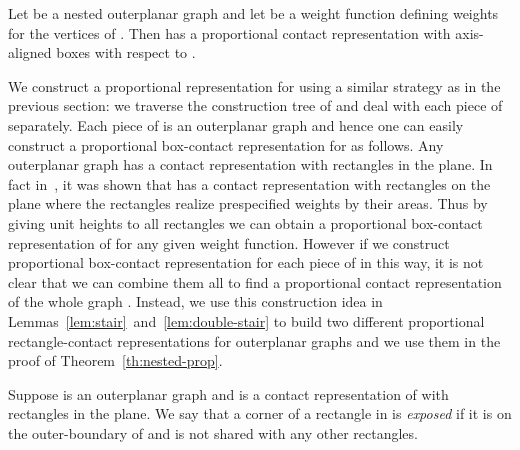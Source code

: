 \documentclass{llncs}
\begin{document}
\begin{theorem}
\label{th:nested-prop}
	Let  be a nested outerplanar graph and let 
	 be a weight function defining weights for the vertices of . Then  has a
	 proportional contact representation with axis-aligned boxes with respect to .
\end{theorem}

We construct a proportional representation for  using a similar strategy as in the previous
 section: we traverse the construction tree  of  and deal with each piece
 of  separately. Each piece  of  is an outerplanar graph and hence one can easily
 construct a proportional box-contact representation for  as follows. Any outerplanar
 graph  has a contact representation with rectangles in the plane. In fact in~\cite{ourAlg13},
 it was shown that  has a contact representation with rectangles
 on the plane where the rectangles realize prespecified weights by
 their areas. Thus by giving unit heights to all rectangles we can
 obtain a proportional box-contact representation of  for any given
 weight function. 
However if we construct proportional box-contact representation for each piece of  in this way,
it is not clear that we can combine them all to find a proportional contact representation of the
 whole graph . 
Instead, we use this construction idea in Lemmas~\ref{lem:stair}~and~\ref{lem:double-stair} to
build two different proportional rectangle-contact representations for
outerplanar graphs
and we use them in the proof of Theorem~\ref{th:nested-prop}. 

Suppose  is an outerplanar graph and  is a contact representation of  with rectangles
 in the plane. We say that a corner of a rectangle in  is \textit{exposed} if it is
 on the outer-boundary of  and is not shared with any other rectangles.
\end{document}
